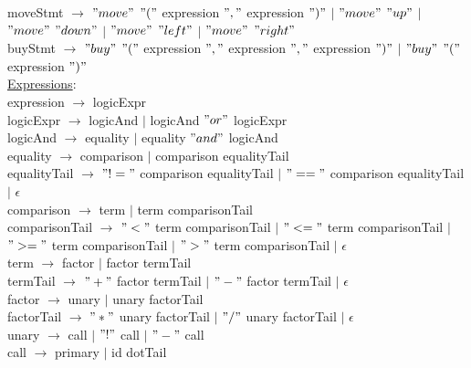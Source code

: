 \documentclass{article}
\begin{document}
moveStmt $\rightarrow$ $"move"$ $"("$ expression $","$ expression $")"$ $\vert$ $"move"$ $"up"$ $\vert$ $"move"$ $"down"$ $\vert$ $"move"$ $"left"$ $\vert$ $"move"$ $"right"$ \\

buyStmt $\rightarrow$ $"buy"$ $"("$ expression $","$ expression $","$ expression $")"$ $\vert$ $"buy"$ $"("$ expression $")"$\\

\underline{Expressions}: \\

expression $\rightarrow$ logicExpr \\

logicExpr $\rightarrow$ logicAnd  $\vert$ logicAnd $"or"$ logicExpr \\

logicAnd $\rightarrow$ equality $\vert$ equality $"and"$ logicAnd \\

equality $\rightarrow$ comparison $\vert$ comparison equalityTail \\

equalityTail $\rightarrow$ $"!="$ comparison equalityTail $\vert$ $"=="$ comparison equalityTail $\vert$ $\epsilon$ \\

comparison $\rightarrow$ term $\vert$ term comparisonTail \\

comparisonTail $\rightarrow$ $"<"$ term comparisonTail $\vert$ $"<="$ term comparisonTail $\vert$ $">="$ term comparisonTail $\vert$ $">"$ term comparisonTail $\vert$ $\epsilon$ \\

term $\rightarrow$ factor $\vert$ factor termTail \\

termTail $\rightarrow$ $"+"$ factor termTail $\vert$ $"-"$ factor termTail $\vert$ $\epsilon$ \\

factor $\rightarrow$ unary $\vert$ unary factorTail \\

factorTail $\rightarrow$ $"*"$ unary factorTail $\vert$ $"/"$ unary factorTail $\vert$ $\epsilon$ \\

unary $\rightarrow$ call $\vert$ $"!"$ call $\vert$ $"-"$ call \\

call $\rightarrow$ primary $\vert$ id dotTail \\
\end{document}
